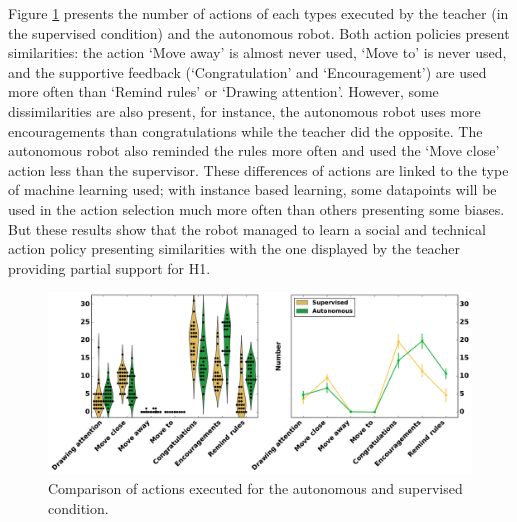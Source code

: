 Figure \ref{fig:tutoring_actions} presents the number of actions of each types executed by the teacher (in the supervised condition) and the autonomous robot. Both action policies present similarities: the action `Move away' is almost never used, `Move to' is never used, and the supportive feedback (`Congratulation' and `Encouragement') are used more often than `Remind rules' or `Drawing attention'. However, some dissimilarities are also present, for instance, the autonomous robot uses more encouragements than congratulations while the teacher did the opposite. The autonomous robot also reminded the rules more often and used the `Move close' action less than the supervisor. These differences of actions are linked to the type of machine learning used; with instance based learning, some datapoints will be used in the action selection much more often than others presenting some biases. But these results show that the robot managed to learn a social and technical action policy presenting similarities with the one displayed by the teacher providing partial support for H1.

\begin{figure}[ht]
	\includegraphics[width=1\linewidth]{actions.pdf}
	\centering
	\caption{Comparison of actions executed for the autonomous and supervised condition.}
	\label{fig:tutoring_actions}
\end{figure}


%


